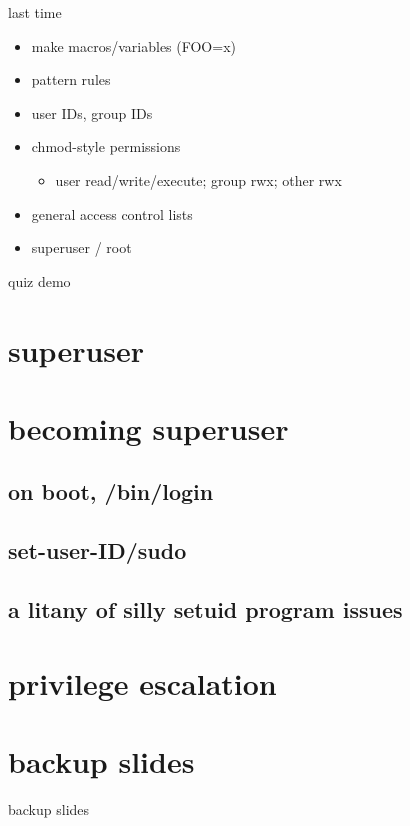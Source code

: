 \date{}
\title{}
\date{}

\begin{frame}
    \titlepage
\end{frame}

\begin{frame}{last time}
    \begin{itemize}
    \item make macros/variables (FOO=x)
    \item pattern rules
    \vspace{.5cm}
    \item user IDs, group IDs
    \item chmod-style permissions
        \begin{itemize}
        \item user read/write/execute; group rwx; other rwx
        \end{itemize}
    \item general access control lists
    \item superuser / root
    \end{itemize}
\end{frame}



\begin{frame}{quiz demo}
\end{frame}

\section{superuser}


\section{becoming superuser}

\subsection{on boot, /bin/login}


\subsection{set-user-ID/sudo}




\subsection{a litany of silly setuid program issues}


\section{privilege escalation}





\section{backup slides}
\begin{frame}{backup slides}
\end{frame}






